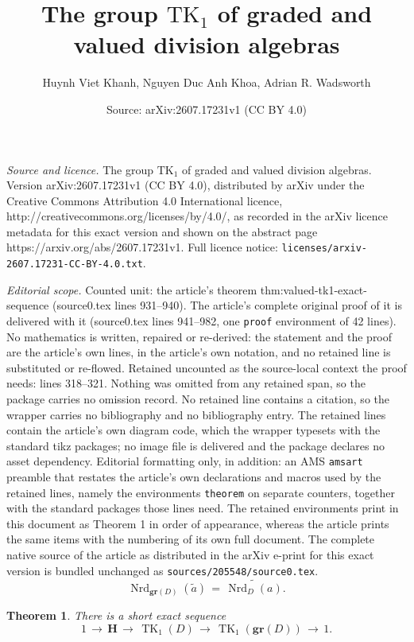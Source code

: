 \documentclass[10pt,a4paper]{amsart}
\title{The group $\mathrm{TK}_1$ of graded and valued division algebras}
\author{Huynh Viet Khanh, Nguyen Duc Anh Khoa, Adrian R. Wadsworth}
\date{Source: arXiv:2607.17231v1 (CC BY 4.0)}
\newtheorem{theorem}{Theorem}
\newcommand{\Nrd}{\opn{Nrd}}
\newcommand{\gr}{\mathbf{gr}}
\newcommand{\opn}{\operatorname}
\newcommand{\wt}{\widetilde}
\begin{document}
\maketitle

\noindent\emph{Source and licence.} The group $\mathrm{TK}_1$ of graded and valued division algebras. Version arXiv:2607.17231v1 (CC BY 4.0), distributed by arXiv under the Creative Commons Attribution 4.0 International licence, http://creativecommons.org/licenses/by/4.0/, as recorded in the arXiv licence metadata for this exact version and shown on the abstract page https://arxiv.org/abs/2607.17231v1. Full licence notice: \texttt{licenses/arxiv-2607.17231-CC-BY-4.0.txt}.\par\smallskip

\noindent\textit{Editorial scope.} Counted unit: the article's theorem thm:valued-tk1-exact-sequence (source0.tex lines 931--940). The article's complete original proof of it is delivered with it (source0.tex lines 941--982, one \texttt{proof} environment of 42 lines). No mathematics is written, repaired or re-derived: the statement and the proof are the article's own lines, in the article's own notation, and no retained line is substituted or re-flowed.  Retained uncounted as the source-local context the proof needs: lines 318--321.  Nothing was omitted from any retained span, so the package carries no omission record.  No retained line contains a citation, so the wrapper carries no bibliography and no bibliography entry.  The retained lines contain the article's own diagram code, which the wrapper typesets with the standard tikz packages; no image file is delivered and the package declares no asset dependency.  Editorial formatting only, in addition: an AMS \texttt{amsart} preamble that restates the article's own declarations and macros used by the retained lines, namely the environments \texttt{theorem} on separate counters, together with the standard packages those lines need.  The retained environments print in this document as Theorem 1 in order of appearance, whereas the article prints the same items with the numbering of its own full document.  The complete native source of the article as distributed in the arXiv e-print for this exact version is bundled unchanged as \texttt{sources/205548/source0.tex}.
\begin{equation}
\label{eq:Nrdcompatibility}
\Nrd_{\gr(D)}(\wt a) \, = \, \wt{\Nrd_D(a)}.
\end{equation}  

\begin{theorem}
\label{thm:valued-tk1-exact-sequence}
There is a short exact sequence
\begin{equation}
\label{SESforH}
        1\,\longrightarrow \,\mathbf{H}\,\longrightarrow \,\operatorname{TK}_1(D)\,\longrightarrow\, 
        \operatorname{TK}_1(\gr(D))\,\longrightarrow \,1.
\end{equation}

\end{theorem}
\end{document}
